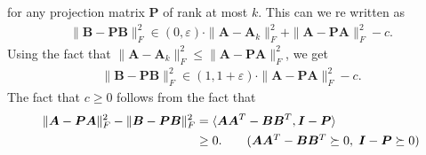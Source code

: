 \documentclass[11pt]{article}
\makeatletter
\theoremstyle{plain}
\theoremstyle{plain}
\theoremstyle{definition}
\theoremstyle{plain}
\theoremstyle{remark}
\newenvironment{proof}[1][\protect\proofname]{\par
	\normalfont\topsep6\p@\@plus6\p@\relax
	\trivlist
	\itemindent\parindent
	\item[\hskip\labelsep\scshape #1]\ignorespaces
}{\endtrivlist\@endpefalse
}
\providecommand{\proofname}{Proof}
\makeatother
\begin{document}
\begin{proof}
for any projection matrix $\bm{P}$ of rank at most $k$. This can we re written as 
\begin{align}
\label{eqn:approximate_cost_2}
\|\bm{B}-\bm{P}\bm{B}\|_F^2 \in (0,\varepsilon)\cdot\|\bm{A}-\bm{A}_k\|_F^2+ \|\bm{A}-\bm{P}\bm{A}\|_F^2 -c.
\end{align}
Using the fact that $\|\bm{A}-\bm{A}_k\|_F^2\leq \|\bm{A}-\bm{P}\bm{A}\|_F^2$, we get 
\begin{align*}
\|\bm{B}-\bm{P}\bm{B}\|_F^2 \in (1,1+\varepsilon)\cdot \|\bm{A}-\bm{P}\bm{A}\|_F^2 -c.
\end{align*}
The fact that $c\geq 0$ follows from the fact that 
\begin{align}
    \|\bm{A}-\bm{P}\bm{A}\|_F^2-\|\bm{B}-\bm{P}\bm{B}\|_F^2&= \langle\bm{A}\bm{A}^T- \bm{B}\bm{B}^T, \bm{I}-\bm{P} \rangle\\
    &\geq 0. \tag{$\bm{A}\bm{A}^T -\bm{B}\bm{B}^T \succeq 0, \; \bm{I}-\bm{P}\succeq 0$}
\end{align}
\end{proof}
\end{document}
